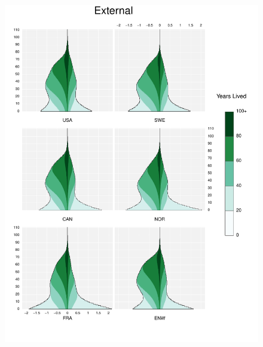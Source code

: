 \documentclass{article}
\begin{document}
\begin{appendices}
\begin{figure}
\includegraphics[scale=.8]{Figures/Causes/DyxExternal.pdf}
\end{figure}
\begin{figure}
\centering

\end{figure}
\end{appendices}
\end{document}
